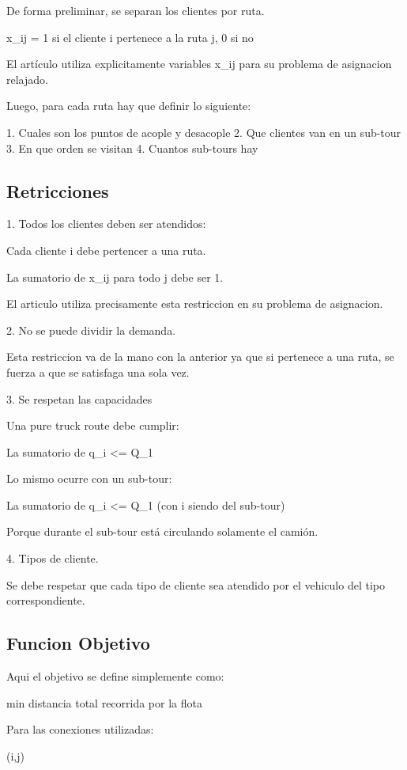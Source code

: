 \documentclass[letter, 10pt]{article}
\begin{document}
De forma preliminar, se separan los clientes por ruta.

x_ij = 1 si el cliente i pertenece a la ruta j, 0 si no

El artículo utiliza explicitamente variables x_ij para su problema de asignacion relajado.

Luego, para cada ruta hay que definir lo siguiente:

1. Cuales son los puntos de acople y desacople
2. Que clientes van en un sub-tour
3. En que orden se visitan
4. Cuantos sub-tours hay

\subsection{Retricciones}

1. Todos los clientes deben ser atendidos:

Cada cliente i debe pertencer a una ruta.

La sumatorio de x_ij para todo j debe ser 1.

El articulo utiliza precisamente esta restriccion en su problema de asignacion.

2. No se puede dividir la demanda.

Esta restriccion va de la mano con la anterior ya que si pertenece a una ruta, se fuerza a que se satisfaga una sola vez.

3. Se respetan las capacidades

Una pure truck route debe cumplir:

La sumatorio de q_i <= Q_1

Lo mismo ocurre con un sub-tour:

La sumatorio de q_i <= Q_1 (con i siendo del sub-tour)

Porque durante el sub-tour está circulando solamente el camión.

4. Tipos de cliente.

Se debe respetar que cada tipo de cliente sea atendido por el vehiculo del tipo correspondiente.

\subsection{Funcion Objetivo}

Aqui el objetivo se define simplemente como:

min distancia total recorrida por la flota

Para las conexiones utilizadas:

(i,j)
\end{document}
